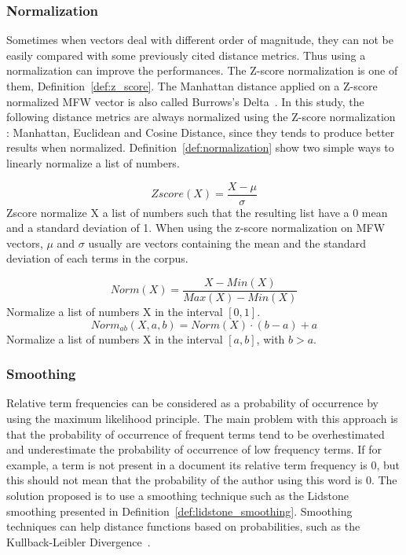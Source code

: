 \subsubsection{Normalization}

Sometimes when vectors deal with different order of magnitude, they can not be easily compared with some previously cited distance metrics.
Thus using a normalization can improve the performances.
The Z-score normalization is one of them, Definition~\ref{def:z_score}.
The Manhattan distance applied on a Z-score normalized MFW vector is also called Burrows's Delta~\cite{savoy_stylo}.
In this study, the following distance metrics are always normalized using the Z-score normalization : Manhattan, Euclidean and Cosine Distance, since they tends to produce better results when normalized.
Definition~\ref{def:normalization} show two simple ways to linearly normalize a list of numbers.

\begin{definition}
  \label{def:z_score}
  \begin{equation}
    Zscore(X) = \frac{X - \mu}{\sigma}
  \end{equation}
  Zscore normalize X a list of numbers such that the resulting list have a 0 mean and a standard deviation of 1.
  When using the z-score normalization on MFW vectors, $\mu$ and $\sigma$ usually are vectors containing the mean and the standard deviation of each terms in the corpus.
\end{definition}

\begin{definition}
  \label{def:normalization}
  \begin{equation}
    Norm(X) = \frac{X - Min(X)}{Max(X) - Min(X)}
  \end{equation}
  Normalize a list of numbers X in the interval $[0, 1]$.
  \begin{equation}
    Norm_{ab}(X, a, b) = Norm(X) \cdot (b - a) + a
  \end{equation}
  Normalize a list of numbers X in the interval $[a, b]$, with $b > a$.
\end{definition}

\subsubsection{Smoothing}

Relative term frequencies can be considered as a probability of occurrence by using the maximum likelihood principle.
The main problem with this approach is that the probability of occurrence of frequent terms tend to be overhestimated and underestimate the probability of occurrence of low frequency terms.
If for example, a term is not present in a document its relative term frequency is 0, but this should not mean that the probability of the author using this word is 0.
The solution proposed is to use a smoothing technique such as the Lidstone smoothing presented in Definition~\ref{def:lidstone_smoothing}.
Smoothing techniques can help distance functions based on probabilities, such as the Kullback-Leibler Divergence~\cite{savoy_stylo}.

